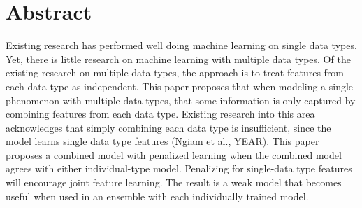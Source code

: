 
\section{Abstract}

Existing research has performed well doing machine learning on single data types.
Yet, there is little research on machine learning with multiple data types. Of the
existing research on multiple data types, the approach is to treat features from
each data type as independent. This paper proposes that when modeling a single
phenomenon with multiple data types, that some information is only captured by
combining features from each data type.  Existing research into this area acknowledges that simply combining each data type is insufficient, since the model learns single data type features (Ngiam et al., YEAR).
This paper proposes a combined model with penalized learning when the combined model agrees with either individual-type model.
Penalizing for single-data type features will encourage joint feature learning.
The result is a weak model that becomes useful when used in an ensemble with each individually trained model.  










